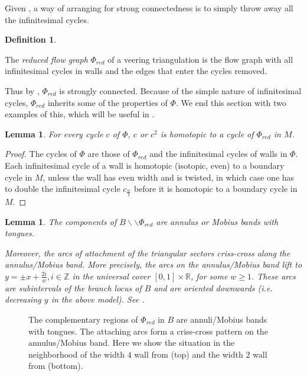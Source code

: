 \documentclass[12pt]{amsart}
\newtheorem{lemma}[thm]{Lemma}
\theoremstyle{definition}
\newtheorem{defn}[thm]{Definition}
\numberwithin{equation}{section}
\begin{document}
Given , a way of arranging for strong connectedness is to simply  throw away all the infinitesimal cycles.

\begin{defn} \label{defn:reducedflowgraph}

The \textit{reduced flow graph} $\Phi_{red}$ of a veering triangulation is the flow graph with all infinitesimal cycles in walls and the edges that enter the cycles removed.

\end{defn}

Thus by , $\Phi_{red}$ is strongly connected. Because of the simple nature of infinitesimal cycles, $\Phi_{red}$ inherits some of the properties of $\Phi$. We end this section with two examples of this, which will be useful in .

\begin{lemma} \label{lemma:flowgraphsorbits}
For every cycle $c$ of $\Phi$, $c$ or $c^2$ is homotopic to a cycle of $\Phi_{red}$ in $M$.
\end{lemma}

\begin{proof}
The cycles of $\Phi$ are those of $\Phi_{red}$ and the infinitesimal cycles of walls in $\Phi$. Each infinitesimal cycle of a wall is homotopic (isotopic, even) to a boundary cycle in $M$, unless the wall has even width and is twisted, in which case one has to double the infinitesimal cycle $c_{\frac{w}{2}}$ before it is homotopic to a boundary cycle in $M$.
\end{proof}

\begin{lemma} \label{lemma:redflowgraphcompl}
The components of $B \backslash \backslash \Phi_{red}$ are annulus or Mobius bands with tongues.

Moreover, the arcs of attachment of the triangular sectors criss-cross along the annulus/Mobius band. More precisely, the arcs on the annulus/Mobius band lift to $y=\pm x + \frac{2i}{w}, i \in \mathbb{Z}$ in the universal cover $[0,1] \times \mathbb{R}$, for some $w \geq 1$. These arcs are subintervals of the branch locus of $B$ and are oriented downwards (i.e. decreasing $y$ in the above model). See .
\end{lemma}

\begin{figure}
    \centering
    \resizebox{!}{12cm}{}
    \caption{The complementary regions of $\Phi_{red}$ in $B$ are annuli/Mobius bands with tongues. The attaching arcs form a criss-cross pattern on the annulus/Mobius band. Here we show the situation in the neighborhood of the width $4$ wall from  (top) and the width $2$ wall from  (bottom).}
    \label{fig:redflowgraphcompl}
\end{figure}
\end{document}
